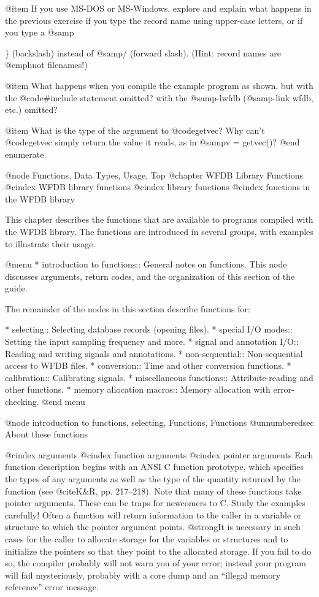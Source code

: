 {{{{{{{@item
If you use MS-DOS or MS-Windows, explore and explain what happens in
the previous exercise if you type the record name using upper-case
letters, or if you type a @samp{\} (backslash) instead of @samp{/}
(forward slash).  (Hint: record names are @emph{not} filenames!)

@item
What happens when you compile the example program as shown, but with the
@code{#include} statement omitted?  with the @samp{-lwfdb} (@samp{-link wfdb},
etc.) omitted?

@item
What is the type of the argument to @code{getvec}?  Why can't @code{getvec}
simply return the value it reads, as in @samp{v = getvec()}?
@end enumerate

@node     Functions, Data Types, Usage, Top
@chapter WFDB Library Functions
@cindex WFDB library functions
@cindex library functions
@cindex functions in the WFDB library

This chapter describes the functions that are available to programs
compiled with the WFDB library.  The functions are introduced in
several groups, with examples to illustrate their usage.

@menu
* introduction to functions::	General notes on functions.
				This node discusses arguments, return codes,
				and the organization of this section of
				the guide.

The remainder of the nodes in this section describe functions for:
				
* selecting::			Selecting database records (opening files).
* special I/O modes::           Setting the input sampling frequency and more.
* signal and annotation I/O::	Reading and writing signals and annotations.
* non-sequential::		Non-sequential access to WFDB files.
* conversion::			Time and other conversion functions.
* calibration::			Calibrating signals.
* miscellaneous functions::	Attribute-reading and other functions.
* memory allocation macros::    Memory allocation with error-checking.
@end menu

@node     introduction to functions, selecting, Functions, Functions
@unnumberedsec About these functions

@cindex arguments
@cindex function arguments
@cindex pointer arguments
Each function description begins with an ANSI C function prototype, which
specifies the types of any arguments as well as the type of the quantity
returned by the function (see @cite{K&R}, pp. 217--218).  Note that many
of these functions take pointer arguments.  These can be traps for
newcomers to C.  Study the examples carefully!  Often a function will
return information to the caller in a variable or structure to which the
pointer argument points.  @strong{It is necessary in such cases for the
caller to allocate storage for the variables or structures and to
initialize the pointers so that they point to the allocated storage.  If
you fail to do so, the compiler probably will not warn you of your
error; instead your program will fail mysteriously, probably with a core
dump and an ``illegal memory reference'' error message.}

}}}}}}}}
